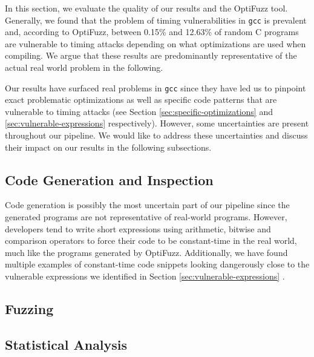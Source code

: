 In this section, we evaluate the quality of our results and the OptiFuzz tool.
Generally, we found that the problem of timing vulnerabilities in \texttt{gcc} is prevalent and, according to OptiFuzz, between 0.15\% and 12.63\% of random C programs are vulnerable to timing attacks depending on what optimizations are used when compiling. 
We argue that these results are predominantly representative of the actual real world problem in the following.

Our results have surfaced real problems in \texttt{gcc} since they have led us to pinpoint exact problematic optimizations as well as specific code patterns that are vulnerable to timing attacks (see Section \ref{sec:specific-optimizations} and \ref{sec:vulnerable-expressions} respectively).
However, some uncertainties are present throughout our pipeline.
We would like to address these uncertainties and discuss their impact on our results in the following subsections.

\subsection{Code Generation and Inspection}
Code generation is possibly the most uncertain part of our pipeline since the generated programs are not representative of real-world programs.
However, developers tend to write short expressions using arithmetic, bitwise and comparison operators to force their code to be constant-time in the real world, much like the programs generated by OptiFuzz. 
Additionally, we have found multiple examples of constant-time code snippets looking dangerously close to the vulnerable expressions we identified in Section \ref{sec:vulnerable-expressions} \citep{fact,what-you-c} .


\subsection{Fuzzing}

\subsection{Statistical Analysis}


